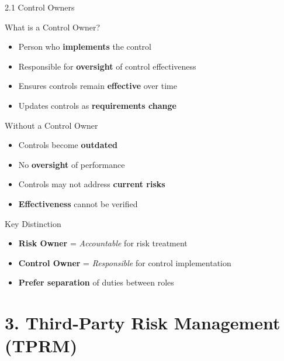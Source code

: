 \documentclass{beamer}
\begin{document}
	\begin{frame}{2.1 Control Owners}
		\begin{block}{What is a Control Owner?}
			\begin{itemize}
				\item Person who \textbf{implements} the control
				\item Responsible for \textbf{oversight} of control effectiveness
				\item Ensures controls remain \textbf{effective} over time
				\item Updates controls as \textbf{requirements change}
			\end{itemize}
		\end{block}
		
		\begin{block}{Without a Control Owner}
			\begin{itemize}
				\item Controls become \textbf{outdated}
				\item No \textbf{oversight} of performance
				\item Controls may not address \textbf{current risks}
				\item \textbf{Effectiveness} cannot be verified
			\end{itemize}
		\end{block}
		
		\begin{exampleblock}{Key Distinction}
			\begin{itemize}
				\item \textbf{Risk Owner} = \textit{Accountable} for risk treatment
				\item \textbf{Control Owner} = \textit{Responsible} for control implementation
				\item \textbf{Prefer separation} of duties between roles
			\end{itemize}
		\end{exampleblock}
	\end{frame}
	
	\section{3. Third-Party Risk Management (TPRM)}
	
\end{document}
